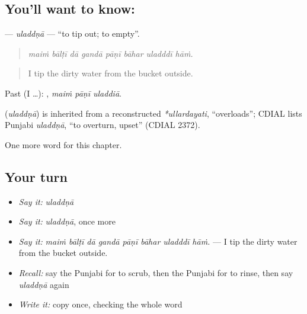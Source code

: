 \subsection*{You'll want to know: }
\textbf{} — \emph{uladdṇā} — \textquotedblleft{}to tip out; to empty\textquotedblright{}.

\begin{quote}
       
\end{quote}

\begin{quote}
\emph{maiṁ bālṭī dā gandā pāṇī bāhar uladddī hāṁ.}
\end{quote}

\begin{quote}
I tip the dirty water from the bucket outside.
\end{quote}

Past (I …):   , \emph{maiṁ pāṇī uladdiā}.

\begin{cousinweb}
\textbf{} (\emph{uladdṇā}) is inherited from a reconstructed \emph{*ullardayati}, \textquotedblleft{}overloads\textquotedblright{}; CDIAL lists Punjabi \emph{uladdṇā}, \textquotedblleft{}to overturn, upset\textquotedblright{} (CDIAL 2372).
\end{cousinweb}

\begin{grammarlens}[title={What you've built}]
One more word for this chapter.
\end{grammarlens}

\subsection*{Your turn}
\begin{itemize}
\raggedright
  \item \emph{Say it:} \emph{uladdṇā}
  \item \emph{Say it:} \emph{uladdṇā}, once more
  \item \emph{Say it:} \emph{maiṁ bālṭī dā gandā pāṇī bāhar uladddī hāṁ.} — I tip the dirty water from the bucket outside.
  \item \emph{Recall:} say the Punjabi for to scrub, then the Punjabi for to rinse, then say \emph{uladdṇā} again
  \item \emph{Write it:} copy \textbf{} once, checking the whole word
\end{itemize}


